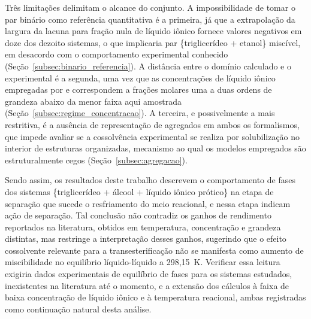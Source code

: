 Três limitações delimitam o alcance do conjunto. A impossibilidade de tomar o par binário como referência quantitativa é a primeira, já que a extrapolação da largura da lacuna para fração nula de líquido iônico fornece valores negativos em doze dos dezoito sistemas, o que implicaria par \{triglicerídeo + etanol\} miscível, em desacordo com o comportamento experimental conhecido (Seção~\ref{subsec:binario_referencia}). A distância entre o domínio calculado e o experimental é a segunda, uma vez que as concentrações de líquido iônico empregadas por  e  correspondem a frações molares uma a duas ordens de grandeza abaixo da menor faixa aqui amostrada (Seção~\ref{subsec:regime_concentracao}). A terceira, e possivelmente a mais restritiva, é a ausência de representação de agregados em ambos os formalismos, que impede avaliar se a cossolvência experimental se realiza por solubilização no interior de estruturas organizadas, mecanismo ao qual os modelos empregados são estruturalmente cegos (Seção~\ref{subsec:agregacao}).

Sendo assim, os resultados deste trabalho descrevem o comportamento de fases dos sistemas \{triglicerídeo + álcool + líquido iônico prótico\} na etapa de separação que sucede o resfriamento do meio reacional, e nessa etapa indicam ação de separação. Tal conclusão não contradiz os ganhos de rendimento reportados na literatura, obtidos em temperatura, concentração e grandeza distintas, mas restringe a interpretação desses ganhos, sugerindo que o efeito cossolvente relevante para a transesterificação não se manifesta como aumento de miscibilidade no equilíbrio líquido-líquido a 298,15~K. Verificar essa leitura exigiria dados experimentais de equilíbrio de fases para os sistemas estudados, inexistentes na literatura até o momento, e a extensão dos cálculos à faixa de baixa concentração de líquido iônico e à temperatura reacional, ambas registradas como continuação natural desta análise.